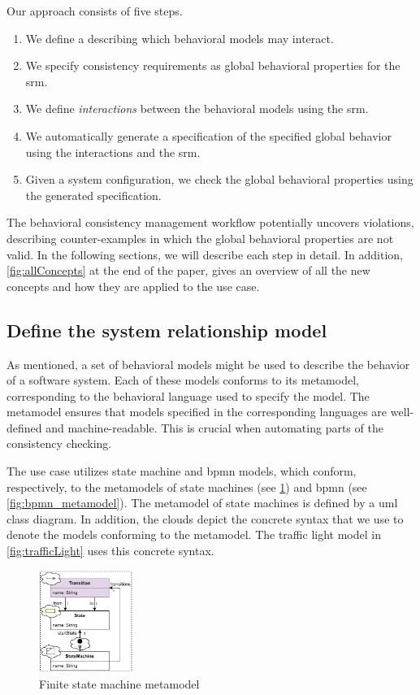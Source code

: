 \documentclass{jot}
\begin{document}
Our approach consists of five steps.
\begin{enumerate}
    \item We define a \emph{} describing which behavioral models may interact.
    \item We specify consistency requirements as global behavioral properties for the \gls*{srm}.
    \item We define \emph{interactions} between the behavioral models using the \gls*{srm}.
    \item We automatically generate a specification of the specified global behavior using the interactions and the \gls*{srm}.
    \item Given a system configuration, we check the global behavioral properties using the generated specification.
\end{enumerate}
The behavioral consistency management workflow potentially uncovers violations, describing counter-examples in which the global behavioral properties are not valid.
In the following sections, we will describe each step in detail.
In addition, \cref{fig:allConcepts} at the end of the paper, gives an overview of all the new concepts and how they are applied to the use case.


\subsection{Define the system relationship model}
As mentioned, a set of behavioral models might be used to describe the behavior of a software system.
Each of these models conforms to its metamodel, corresponding to the behavioral language used to specify the model.
The metamodel ensures that models specified in the corresponding languages are well-defined and machine-readable.
This is crucial when automating parts of the consistency checking.

The use case utilizes state machine and \gls*{bpmn} models, which conform, respectively, to the metamodels of state machines (see \cref{fig:fsm_metamodel}) and \gls*{bpmn} (see \cref{fig:bpmn_metamodel}).
The metamodel of state machines is defined by a \gls*{uml} class diagram.
In addition, the clouds depict the concrete syntax that we use to denote the models conforming to the metamodel.
The traffic light model in \cref{fig:trafficLight} uses this concrete syntax.

\begin{figure}[h]
    \centering
    \includegraphics[width=0.275\textwidth]{figures/state_machine_metamodel.pdf}
    \caption{Finite state machine metamodel}
    \label{fig:fsm_metamodel}
\end{figure}
\end{document}
